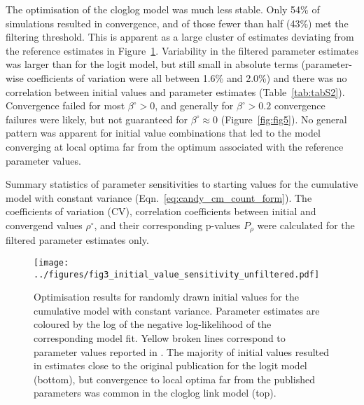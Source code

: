 The optimisation of the cloglog model was much less stable. Only 54\% of simulations resulted in convergence, and of those fewer than half (43\%) met the filtering threshold. This is apparent as a large cluster of estimates deviating from the reference estimates in Figure~\ref{fig:fig3}. Variability in the filtered parameter estimates was larger than for the logit model, but still small in absolute terms (parameter-wise coefficients of variation were all between 1.6\% and 2.0\%) and there was no correlation between initial values and parameter estimates (Table~\ref{tab:tabS2}). Convergence failed for most $\beta^{\circ}>0$, and generally for $\beta^{\circ}>0.2$ convergence failures were likely, but not guaranteed for $\beta^{\circ}\approx 0$ (Figure~\ref{fig:fig5}). No general pattern was apparent for initial value combinations that led to the model converging at local optima far from the optimum associated with the reference parameter values.


\begin{table}[bph]
  \small
    \centering
    \caption{Summary statistics of parameter sensitivities to starting values for the cumulative model with constant variance (Eqn.~\ref{eq:candy_cm_count_form}). The coefficients of variation (CV), correlation coefficients between initial and convergend values $\rho^{\circ}$, and their corresponding p-values $P_\rho$ were calculated for the filtered parameter estimates only.
    }
  
  \label{tab:tabS2}
\end{table}


\begin{figure}[htbp]
  \centering
  \texttt{[image: ../figures/fig3\_initial\_value\_sensitivity\_unfiltered.pdf]}
  \caption{Optimisation results for randomly drawn initial values for the cumulative model with constant variance. Parameter estimates are coloured by the log of the negative log-likelihood of the corresponding model fit. Yellow broken lines correspond to parameter values reported in \citep{candy1991modeling}. The majority of initial values resulted in estimates close to the original publication for the logit model (bottom), but convergence to local optima far from the published parameters was common in the cloglog link model (top).}
  \label{fig:fig3}
\end{figure} 

